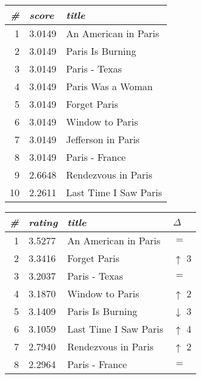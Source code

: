 \begin{table}[t]
  \centering 
  \begin{minipage}{0.49\textwidth}
    \centering 

  \begin{tabular*}{\textwidth}{ r l l }
    \toprule
    \emph{\#} & \emph{score} & \emph{title}\\
    \midrule
    1 & 3.0149  &  An American in Paris       \\
    2 & 3.0149  &  Paris Is Burning           \\
    3 & 3.0149  &  Paris - Texas              \\
    4 & 3.0149  &  Paris Was a Woman          \\
    5 & 3.0149  &  Forget Paris               \\
    6 & 3.0149  &  Window to Paris            \\
    7 & 3.0149  &  Jefferson in Paris         \\
    8 & 3.0149  &  Paris - France             \\
    9 & 2.6648  &  Rendezvous in Paris        \\
    10& 2.2611  &  Last Time I Saw Paris  \\
    \bottomrule
  \end{tabular*}
\end{minipage} 
\hfill 
\begin{minipage}{0.49\textwidth}
  \begin{tabular*}{\textwidth}{ r l l l }
    \toprule
    \emph{\#} & \emph{rating} & \emph{title} & $\Delta$\\
    \midrule
    1 & 3.5277 &  An American in Paris        & \color{black} $=$ \\
    2 & 3.3416 &  Forget Paris                & \color{green} $\uparrow$ 3 \\
    3 & 3.2037 &  Paris - Texas               & \color{black} $=$ \\
    4 & 3.1870 &  Window to Paris             & \color{green} $\uparrow$ 2 \\
    5 & 3.1409 &  Paris Is Burning            & \color{red} $\downarrow$ 3 \\
    6 & 3.1059 &  Last Time I Saw Paris       & \color{green} $\uparrow$ 4 \\
    7 & 2.7940 &  Rendezvous in Paris         & \color{green} $\uparrow$ 2 \\
    8 & 2.2964 &  Paris - France              & \color{black} $=$ \\

\end{tabular*}
\end{minipage}
\end{table}
